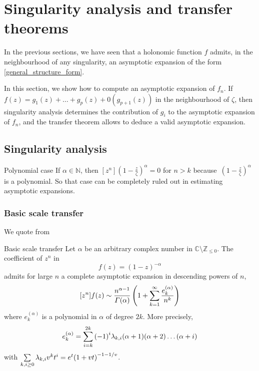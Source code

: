 \documentclass[../main.tex]{subfiles}
\begin{document}
\chapter{Singularity analysis and transfer theorems}

In the previous sections, we have seen that a holonomic function $f$ admits, in the neighbourhood of any singularity, an asymptotic expansion of the form \eqref{general_structure_form}.

In this section, we show how to compute an asymptotic expansion of $f_n$. If $f(z) = g_1(z) + \dots + g_p(z) + 0(g_{p+1}(z))$ in the neighbourhood of $\zeta$, then singularity analysis determines the contribution of $g_i$ to the asymptotic expansion of $f_n$, and the transfer theorem allows to deduce a valid asymptotic expansion.

\section{Singularity analysis}

\begin{thm}{Polynomial case}
	If $\alpha \in \mathbb{N}$, then $[z^n]{\left(1 - \frac{z}{\zeta}\right)}^\alpha = 0$ for $n > k$
	because~${\left(1 - \frac{z}{\zeta}\right)}^\alpha$ is a polynomial. So that case can be completely ruled out in estimating asymptotic expansions.
\end{thm}


\subsection*{Basic scale transfer}

We quote from \cite{Flajolet2009}

\begin{thm}{Basic scale transfer}
	Let $\alpha$ be an arbitrary complex number in
	$\mathbb{C} \setminus \mathbb{Z}_{\leq 0}$.
	The coefficient of $z^n$ in
	\[
	f(z) = {(1 - z)}^{-\alpha}
	\]
	admits for large $n$ a complete asymptotic expansion in descending powers of $n$,
	\[
	[z^n]f(z) \sim \frac{n^{\alpha - 1}}{\Gamma(\alpha)}
	\left(1 + \sum\limits_{k = 1}^{\infty} \frac{e_k^{(\alpha)}}{n^k} \right)
	\]
	where $e_k^{(\alpha)}$ is a polynomial in $\alpha$ of degree $2k$.
	More precisely,
	\[
	e_k^{(\alpha)} = \sum\limits_{i = k}^{2k} {(-1)}^i \lambda_{k, i} (\alpha + 1) (\alpha + 2) \dots (\alpha + i)
	\]
	with $\sum\limits_{k, i \geq 0} \lambda_{k, i} v^k t^i = e^t {(1 + vt)}^{-1 - 1/v}$.
\end{thm}
\end{document}

